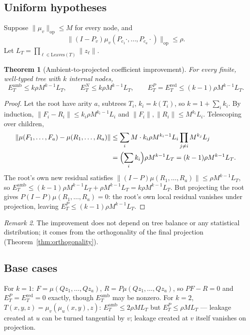 \documentclass[11pt]{amsart}
\newtheorem{theorem}{Theorem}[section]
\theoremstyle{definition}
\theoremstyle{remark}
\newtheorem{remark}[theorem]{Remark}
\DeclareMathOperator{\op}{op}
\begin{document}
\subsection{Uniform hypotheses}

Suppose $\lVert\mu_v\rVert_{\op}\le M$ for every node, and
\[
\lVert (I-P_v)\mu_v(P_{c_1}\cdot,\ldots,P_{c_a}\cdot)\rVert_{\op}\le\rho.
\]
Let $L_T = \prod_{\ell\in\text{Leaves}(T)}\lVert z_\ell\rVert$.

\begin{theorem}[Ambient-to-projected coefficient improvement]
\label{thm:kk1}
For every finite, well-typed tree with $k$ internal nodes,
\[
E_T^{\mathrm{amb}} \le k\rho M^{k-1}L_T,
\qquad
E_T^{N} \le k\rho M^{k-1}L_T,
\qquad
E_T^{P} = E_T^{\mathrm{red}} \le (k-1)\rho M^{k-1}L_T.
\]
\end{theorem}
\begin{proof}
Let the root have arity $a$, subtrees $T_i$, $k_i=k(T_i)$, so
$k = 1+\sum_i k_i$. By induction, $\lVert F_i-R_i\rVert \le k_i\rho M^{k_i-1}L_i$
and $\lVert F_i\rVert,\lVert R_i\rVert \le M^{k_i}L_i$. Telescoping over
children,
\begin{align*}
\lVert\mu(F_1,\ldots,F_a)-\mu(R_1,\ldots,R_a)\rVert
&\le \sum_i M\cdot k_i\rho M^{k_i-1}L_i\prod_{j\neq i}M^{k_j}L_j\\
&= \Bigl(\sum_i k_i\Bigr)\rho M^{k-1}L_T = (k-1)\rho M^{k-1}L_T.
\end{align*}
The root's own new residual satisfies
$\lVert(I-P)\mu(R_1,\ldots,R_a)\rVert \le \rho M^{k-1}L_T$, so
$E_T^{\mathrm{amb}} \le (k-1)\rho M^{k-1}L_T + \rho M^{k-1}L_T = k\rho M^{k-1}L_T$.
But projecting the root gives $P(I-P)\mu(R_1,\ldots,R_a)=0$: the
root's own local residual vanishes under projection, leaving
$E_T^{P}\le (k-1)\rho M^{k-1}L_T$.
\end{proof}

\begin{remark}
The improvement does not depend on tree balance or any statistical
distribution; it comes from the orthogonality of the final projection
(Theorem~\ref{thm:orthogonality}).
\end{remark}

\subsection{Base cases}

For $k=1$: $F=\mu(Qz_1,\ldots,Qz_a)$, $R=P\mu(Qz_1,\ldots,Qz_a)$, so
$PF-R=0$ and $E_T^P=E_T^{\mathrm{red}}=0$ exactly, though
$E_T^{\mathrm{amb}}$ may be nonzero. For $k=2$,
$T(x,y,z)=\mu_v(\mu_u(x,y),z)$: $E_T^{\mathrm{amb}}\le 2\rho ML_T$ but
$E_T^{P}\le \rho ML_T$ — leakage created at $u$ can be turned tangential
by $v$; leakage created at $v$ itself vanishes on projection.
\end{document}
